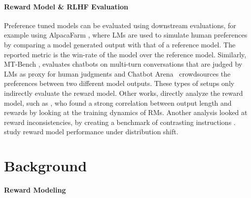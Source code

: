\paragraph{Reward Model \& RLHF Evaluation}
Preference tuned models can be evaluated using downstream evaluations, for example using AlpacaFarm \citep{dubois2024alpacafarm}, where LMs are used to simulate human preferences by comparing a model generated output with that of a reference model. 
The reported metric is the win-rate of the model over the reference model. Similarly, MT-Bench \citep{zheng2023judging}, evaluates chatbots on multi-turn conversations that are judged by LMs as proxy for human judgments and Chatbot Arena~\citep{zheng2023judging} crowdsources the preferences between two different model outputs.
These types of setups only indirectly evaluate the reward model. 
Other works, directly analyze the reward model, such as \citet{singhal2023long}, who found a strong correlation between output length and rewards by looking at the training dynamics of RMs. 
Another analysis looked at reward inconsistencies, by creating a benchmark of contrasting instructions \citep{shen2023trickle}. 
\citet{clymer2023generalization} study reward model performance under distribution shift.

\section{Background}
\label{sec:back}
\paragraph{Reward Modeling}

